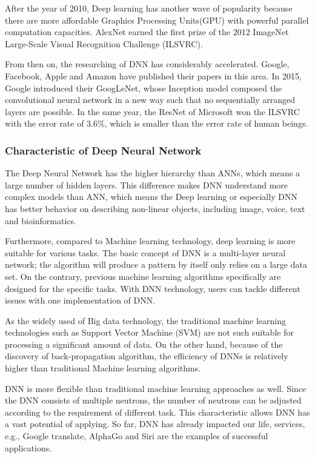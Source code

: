 \documentclass[article]{aaltoseries}
\begin{document}
After the year of 2010, Deep learning has another wave of popularity because there are more affordable Graphics Processing Units(GPU)
 with powerful parallel computation capacities. AlexNet\cite{NIPS2012_4824} earned the first prize of 
the 2012 ImageNet Large-Scale Visual Recognition Challenge (ILSVRC). 

From then on, the researching of DNN has considerably accelerated. Google, Facebook, Apple and Amazon have published
their papers in this area. In 2015, Google introduced their GoogLeNet\cite{GoogLeNet}, whose Inception model composed the convolutional 
neural network in a new way such that no sequentially arranged layers are possible. In the same year, the ResNet\cite{ResNet} of Microsoft won 
the ILSVRC with the error rate of 3.6\%, which is smaller than the error rate of human beings.




\subsubsection{Characteristic of Deep Neural Network}

The Deep Neural Network has the higher hierarchy than ANNs, which means a large number of hidden layers\cite{MAL-006}. 
This difference makes DNN understand more complex models than ANN, which means the Deep learning or especially DNN
has better behavior on describing non-linear objects, including image, voice, text and bioinformatics.

Furthermore, compared to Machine learning technology, deep learning is more suitable for various tasks. The basic concept
of DNN is a multi-layer neural network; the algorithm will produce a pattern by itself only relies on a large data set.
On the contrary, previous machine learning algorithms specifically are designed for the specific tasks. 
With DNN technology, users can tackle different issues with one implementation of DNN. 

As the widely used of Big data technology, the traditional machine learning technologies such as Support Vector Machine (SVM) are
not such suitable for processing a significant amount of data. On the other hand, because of the discovery of back-propagation
algorithm, the efficiency of DNNs is relatively higher than traditional Machine learning algorithms.

DNN is more flexible than traditional machine learning approaches as well. 
Since the DNN consists of multiple neutrons, the number of neutrons can be adjusted
according to the requirement of different task. This characteristic allows DNN has a vast potential of applying. So far, 
DNN has already impacted our life, services, e.g., Google translate, AlphaGo and Siri are the examples of successful applications.
\end{document}
